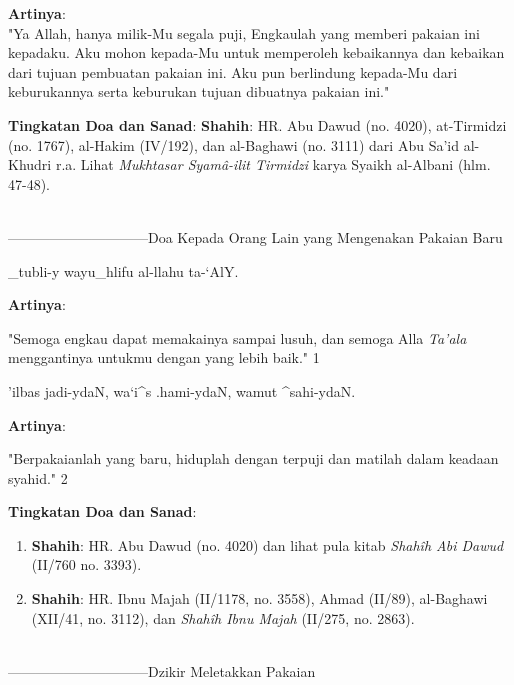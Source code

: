 \documentclass[a4paper,12pt]{article}
\begin{document}
\noindent
\textbf{Artinya}:\\
\indent
"Ya Allah, hanya milik-Mu segala puji, Engkaulah yang memberi pakaian ini 
kepadaku. Aku mohon kepada-Mu untuk memperoleh kebaikannya dan kebaikan 
dari tujuan pembuatan pakaian ini. Aku pun berlindung kepada-Mu dari 
keburukannya serta keburukan tujuan dibuatnya pakaian ini."\\
\par
\noindent
\textbf{Tingkatan Doa dan Sanad}: \textbf{Shahih}: HR. Abu Dawud (no. 
4020), at-Tirmidzi (no. 1767), al-Hakim (IV/192), dan al-Baghawi (no. 3111)
dari Abu Sa'id al-Khudri r.a. Lihat \textit{Mukhtasar Syam\^{a}-ilit
Tirmidzi} karya Syaikh al-Albani (hlm. 47-48). \\\\
\par
{}------------------------------Doa Kepada Orang Lain yang Mengenakan Pakaian Baru
\begin{arabtext}
\noindent
_tubli-y wayu_hlifu al-llahu ta-`AlY.\\
\end{arabtext}
\noindent
\textbf{Artinya}:
\par
\indent
"Semoga engkau dapat memakainya sampai lusuh, dan semoga Alla
\textit{Ta'ala} menggantinya untukmu dengan yang lebih baik." 
{\scriptsize 1}\\
\begin{arabtext}
\noindent
'ilbas jadi-ydaN, wa`i^s .hami-ydaN, wamut ^sahi-ydaN.\\
\end{arabtext}
\noindent
\textbf{Artinya}:
\par
\indent
"Berpakaianlah yang baru, hiduplah dengan terpuji dan matilah dalam keadaan
syahid." {\scriptsize 2}\\
\par
\noindent
\textbf{Tingkatan Doa dan Sanad}:
\begin{enumerate}
\item \textbf{Shahih}: HR. Abu Dawud (no. 4020) dan lihat pula kitab
\textit{Shah\^{i}h Abi Dawud} (II/760 no. 3393).
\item \textbf{Shahih}: HR. Ibnu Majah (II/1178, no. 3558), Ahmad (II/89), 
al-Baghawi (XII/41, no. 3112), dan \textit{Shah\^{i}h Ibnu Majah} (II/275, 
no. 2863).\\\\
\end{enumerate}
\par
{}------------------------------Dzikir Meletakkan Pakaian
\end{document}
